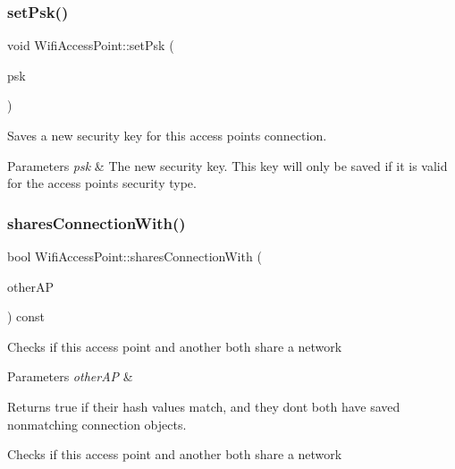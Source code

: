 \subsubsection{\texorpdfstring{set\+Psk()}{setPsk()}}
{\footnotesize\ttfamily void Wifi\+Access\+Point\+::set\+Psk (\begin{DoxyParamCaption}\item[{String}]{psk }\end{DoxyParamCaption})}

Saves a new security key for this access point\textquotesingle{}s connection.


\begin{DoxyParams}{Parameters}
{\em psk} & The new security key. This key will only be saved if it is valid for the access point\textquotesingle{}s security type. \\
\hline
\end{DoxyParams}
\mbox{\label{classWifiAccessPoint_a399a048b0fe892e43f5573d693ced740}} 
\subsubsection{\texorpdfstring{shares\+Connection\+With()}{sharesConnectionWith()}}
{\footnotesize\ttfamily bool Wifi\+Access\+Point\+::shares\+Connection\+With (\begin{DoxyParamCaption}\item[{\mbox{\hyperlink{classWifiAccessPoint_ad18977f884076774803027efbaa131a0}{Wifi\+Access\+Point\+::\+Ptr}}}]{other\+AP }\end{DoxyParamCaption}) const}

Checks if this access point and another both share a network


\begin{DoxyParams}{Parameters}
{\em other\+AP} & \\
\hline
\end{DoxyParams}
\begin{DoxyReturn}{Returns}
true if their hash values match, and they don\textquotesingle{}t both have saved nonmatching connection objects.
\end{DoxyReturn}
Checks if this access point and another both share a network \mbox{\label{classWifiAccessPoint_a1ff885572752abf221ca77e8a619e610}} 
